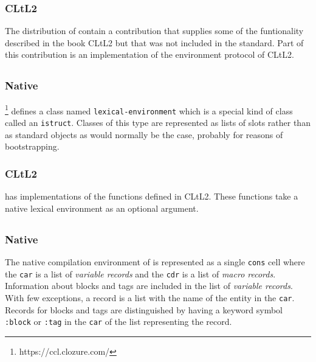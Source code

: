 \subsubsection{CLtL2}

The distribution of \sbcl{} contain a contribution that supplies some
of the funtionality described in the book CLtL2 but that was not
included in the \commonlisp{} standard.  Part of this contribution is
an implementation of the environment protocol of CLtL2.

\subsection{\ccl{}}

\subsubsection{Native}

\ccl{}%
\footnote{https://ccl.clozure.com/}
defines a class named \texttt{lexical-environment} which is a
special kind of class called an \texttt{istruct}.  Classes of this
type are represented as lists of slots rather than as standard objects
as would normally be the case, probably for reasons of bootstrapping.

\subsubsection{CLtL2}

\ccl{} has implementations of the functions defined in CLtL2.  These
functions take a native lexical environment as an optional argument.

\subsection{\cmucl{}}

\subsection{\ecl{}}

\subsubsection{Native}

The native compilation environment of \ecl{} is represented as a
single \texttt{cons} cell where the \texttt{car} is a list of
\emph{variable records} and the \texttt{cdr} is a list of
\emph{macro records}.  Information about blocks and tags are included
in the list of \emph{variable records}.  With few exceptions, a record
is a list with the name of the entity in the \texttt{car}.  Records
for blocks and tags are distinguished by having a keyword symbol
\texttt{:block} or \texttt{:tag} in the \texttt{car} of the list
representing the record.

